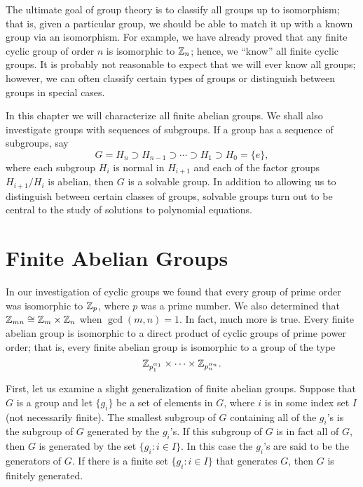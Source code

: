  

The ultimate goal of group theory is to classify all groups up to
isomorphism; that is, given a particular group, we should be able to
match it up with a known group via an isomorphism. For example, we
have already proved that any finite cyclic group of order $n$ is
isomorphic to ${\Bbb Z}_n$; hence, we ``know'' all finite cyclic
groups. It is probably not reasonable to expect that we will ever know
all groups; however, we can often classify certain types of groups or
distinguish between groups in special cases.  

In this chapter we will characterize all finite abelian groups. We
shall also investigate groups with sequences of subgroups.  If a group
has a sequence of subgroups, say 
\[
G = H_n \supset H_{n-1} \supset \cdots \supset H_1 \supset H_0 = \{ e
\}, 
\]
where each subgroup $H_i$ is normal in $H_{i+1}$ and each of the
factor groups $H_{i+1}/H_i$ is abelian, then $G$ is a solvable group.
In addition to allowing us to distinguish between certain classes of
groups, solvable groups turn out to be central to the study of
solutions to polynomial equations.
 

\section{Finite Abelian Groups}

In our investigation of cyclic groups we found that every group of
prime order was isomorphic to ${\Bbb Z}_p$, where $p$ was a prime
number.  We also determined that ${\Bbb Z}_{mn} \cong {\Bbb Z}_m
\times {\Bbb Z}_n$ when $\gcd(m, n) =1$. In fact, much more is true.
Every finite abelian group is isomorphic to a direct product of cyclic
groups of prime power order; that is, every finite abelian group is
isomorphic to a group of the type 
\[
{\Bbb Z}_{p_1^{\alpha_1}} \times \cdots \times {\Bbb
Z}_{p_n^{\alpha_n}}.
\]

First, let us examine a slight generalization  of finite abelian
groups. Suppose that $G$ is a group and let $\{ g_i\}$ be a set of 
elements in $G$, where $i$ is in some index set $I$ (not necessarily 
finite).  The smallest subgroup of $G$ containing all of the $g_i$'s 
is the subgroup of $G$ {\bfi generated\/} by the $g_i$'s. If this 
subgroup of $G$ is in fact all of $G$, then $G$ is generated by the 
set $\{g_i : i \in I \}$. In this case the $g_i$'s are said to be 
the {\bfi generators\/} of $G$. If there is a finite set 
$\{ g_i : i \in I \}$ that generates $G$, then $G$ is {\bfi finitely 
generated}.
 
